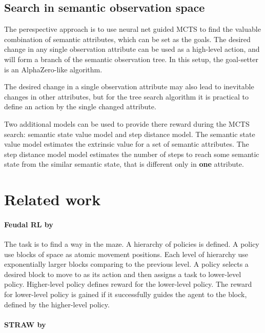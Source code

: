 \documentclass[acmsmall, nonacm]{acmart}
\begin{document}
\subsection{Search in semantic observation space}

The perespective approach is to use neural net guided MCTS to find the valuable combination of semantic attributes, which can be set as the goals. The desired change in any single observation attribute can be used as a high-level action, and will form a branch of the semantic observation tree. In this setup, the goal-setter is an AlphaZero-like algorithm.

The desired change in a single observation attribute may also lead to inevitable changes in other attributes, but for the tree search algorithm it is practical to define an action by the single changed attribute.

Two additional models can be used to provide there reward during the MCTS search: semantic state value model and step distance model. The semantic state value model estimates the extrinsic value for a set of semantic attributes. The step distance model model estimates the number of steps to reach some semantic state from the similar semantic state, that is different only in \textbf{one} attribute.

\section{Related work}
\label{sec:related_work}

\paragraph{Feudal RL by~\citet{Dayan1992FeudalRL}} %
\label{par:feudal_rl}

The task is to find a way in the maze. A hierarchy of policies is defined. A policy use blocks of space as atomic movement positions. Each level of hierarchy use exponentially larger blocks comparing to the previous level. A policy selects a desired block to move to as its action and then assigns a task to lower-level policy. Higher-level policy defines reward for the lower-level policy. The reward for lower-level policy is gained if it successfully guides the agent to the block, defined by the higher-level policy.


\paragraph{STRAW by~\citet{Vezhnevets2016StrategicAW}} %
\label{par:straw}
\end{document}
